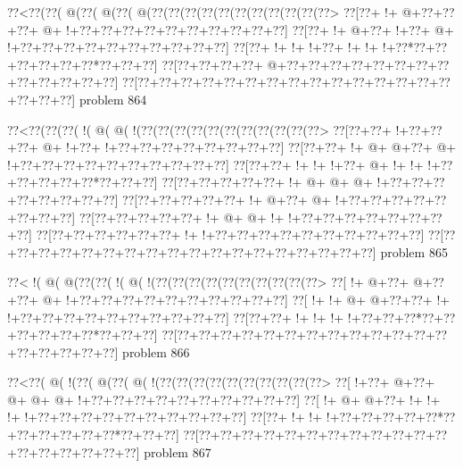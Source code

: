 \vbox{\vbox{\goo
\0??<\0??(\0??(\- @(\0??(\- @(\0??(\- @(\0??(\0??(\0??(\0??(\0??(\0??(\0??(\0??(\0??(\0??(\0??>
\0??[\0??+\- !+\- @+\0??+\0??+\0??+\- @+\- !+\0??+\0??+\0??+\0??+\0??+\0??+\0??+\0??+\0??+\0??]
\0??[\0??+\- !+\- @+\0??+\- !+\0??+\- @+\- !+\0??+\0??+\0??+\0??+\0??+\0??+\0??+\0??+\0??+\0??]
\0??[\0??+\- !+\- !+\- !+\0??+\- !+\- !+\- !+\0??*\0??+\0??+\0??+\0??+\0??+\0??*\0??+\0??+\0??]
\0??[\0??+\0??+\0??+\0??+\- @+\0??+\0??+\0??+\0??+\0??+\0??+\0??+\0??+\0??+\0??+\0??+\0??+\0??]
\0??[\0??+\0??+\0??+\0??+\0??+\0??+\0??+\0??+\0??+\0??+\0??+\0??+\0??+\0??+\0??+\0??+\0??+\0??]
}
\hfil problem 864\hfil\break
}



\vbox{\vbox{\goo
\0??<\0??(\0??(\0??(\- !(\- @(\- @(\- !(\0??(\0??(\0??(\0??(\0??(\0??(\0??(\0??(\0??(\0??(\0??>
\0??[\0??+\0??+\- !+\0??+\0??+\0??+\- @+\- !+\0??+\- !+\0??+\0??+\0??+\0??+\0??+\0??+\0??+\0??]
\0??[\0??+\0??+\- !+\- @+\- @+\0??+\- @+\- !+\0??+\0??+\0??+\0??+\0??+\0??+\0??+\0??+\0??+\0??]
\0??[\0??+\0??+\- !+\- !+\- !+\0??+\- @+\- !+\- !+\- !+\0??+\0??+\0??+\0??+\0??*\0??+\0??+\0??]
\0??[\0??+\0??+\0??+\0??+\0??+\- !+\- @+\- @+\- @+\- !+\0??+\0??+\0??+\0??+\0??+\0??+\0??+\0??]
\0??[\0??+\0??+\0??+\0??+\0??+\- !+\- @+\0??+\- @+\- !+\0??+\0??+\0??+\0??+\0??+\0??+\0??+\0??]
\0??[\0??+\0??+\0??+\0??+\0??+\- !+\- @+\- @+\- !+\- !+\0??+\0??+\0??+\0??+\0??+\0??+\0??+\0??]
\0??[\0??+\0??+\0??+\0??+\0??+\0??+\- !+\- !+\0??+\0??+\0??+\0??+\0??+\0??+\0??+\0??+\0??+\0??]
\0??[\0??+\0??+\0??+\0??+\0??+\0??+\0??+\0??+\0??+\0??+\0??+\0??+\0??+\0??+\0??+\0??+\0??+\0??]
}
\hfil problem 865\hfil\break
}



\vbox{\vbox{\goo
\0??<\- !(\- @(\- @(\0??(\0??(\- !(\- @(\- !(\0??(\0??(\0??(\0??(\0??(\0??(\0??(\0??(\0??(\0??>
\0??[\- !+\- @+\0??+\- @+\0??+\0??+\- @+\- !+\0??+\0??+\0??+\0??+\0??+\0??+\0??+\0??+\0??+\0??]
\0??[\- !+\- !+\- @+\- @+\0??+\0??+\- !+\- !+\0??+\0??+\0??+\0??+\0??+\0??+\0??+\0??+\0??+\0??]
\0??[\0??+\0??+\- !+\- !+\- !+\- !+\0??+\0??+\0??*\0??+\0??+\0??+\0??+\0??+\0??*\0??+\0??+\0??]
\0??[\0??+\0??+\0??+\0??+\0??+\0??+\0??+\0??+\0??+\0??+\0??+\0??+\0??+\0??+\0??+\0??+\0??+\0??]
}
\hfil problem 866\hfil\break
}



\vbox{\vbox{\goo
\0??<\0??(\- @(\- !(\0??(\- @(\0??(\- @(\- !(\0??(\0??(\0??(\0??(\0??(\0??(\0??(\0??(\0??(\0??>
\0??[\- !+\0??+\- @+\0??+\- @+\- @+\- @+\- !+\0??+\0??+\0??+\0??+\0??+\0??+\0??+\0??+\0??+\0??]
\0??[\- !+\- @+\- @+\0??+\- !+\- !+\- !+\- !+\0??+\0??+\0??+\0??+\0??+\0??+\0??+\0??+\0??+\0??]
\0??[\0??+\- !+\- !+\- !+\0??+\0??+\0??+\0??+\0??*\0??+\0??+\0??+\0??+\0??+\0??*\0??+\0??+\0??]
\0??[\0??+\0??+\0??+\0??+\0??+\0??+\0??+\0??+\0??+\0??+\0??+\0??+\0??+\0??+\0??+\0??+\0??+\0??]
}
\hfil problem 867\hfil\break
}




